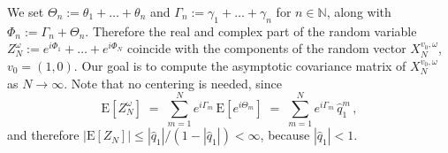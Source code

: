 \documentclass[a4paper,reqno,11pt]{amsart}
\numberwithin{equation}{section}
\newcommand{\go}{\omega}
\newcommand{\N}{\mathbb{N}}
\def\bE{\ensuremath{\bs{\mathrm{E}}}}
\def\bs{\boldsymbol}
\begin{document}
 We set $\Theta_n := \theta_1 + \ldots + \theta_n$ and  $\Gamma_n := \gamma_1 +
\ldots + \gamma_n$ for $n\in\N$, along with $\Phi_n:= \Gamma_n +\Theta_n$.
Therefore the real and complex part of 
the random variable $Z_N^\go:= e^{i\Phi_1}+\ldots +
e^{i\Phi_N}$ coincide with the components
of the random vector $X_N^{v_0,\go}$, $v_0=(1,0)$.
Our goal is to compute the asymptotic covariance matrix of $X_N^{v_0,\go}$
as $N \to \infty$. Note that no centering is needed, since
\begin{equation}
    \bE\left[Z_N^\go\right] \;=\; \sum_{m=1}^N e^{i \Gamma_m} \, \bE\left[e^{i \Theta_m}\right]
    \;=\; \sum_{m=1}^N e^{i \Gamma_m} \, \hat{q}_1^m\,,
\end{equation}
and therefore $|\bE[Z_N]| \le |\hat{q}_1|/(1-|\hat{q}_1|) < \infty$,
because $|\hat q_1| < 1$.
\end{document}
